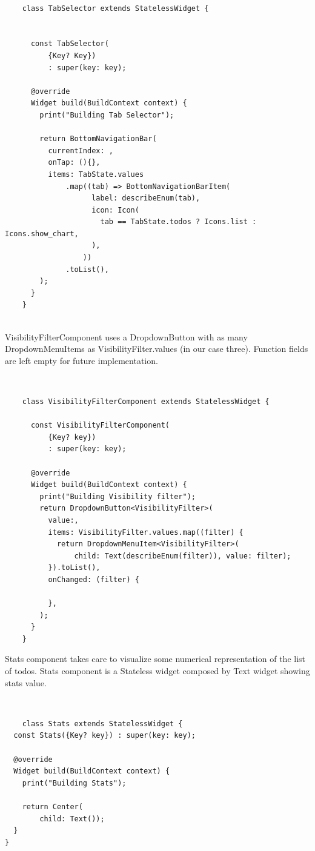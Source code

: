 	\mbox{}\\
	
	 \mbox{}
	\begin{verbatim}
	class TabSelector extends StatelessWidget {
	
	
	  const TabSelector(
	      {Key? Key})
	      : super(key: key);
	
	  @override
	  Widget build(BuildContext context) {
	    print("Building Tab Selector");
	
	    return BottomNavigationBar(
	      currentIndex: ,
	      onTap: (){},
	      items: TabState.values
	          .map((tab) => BottomNavigationBarItem(
	                label: describeEnum(tab),
	                icon: Icon(
	                  tab == TabState.todos ? Icons.list : Icons.show_chart,
	                ),
	              ))
	          .toList(),
	    );
	  }
	}
	
	\end{verbatim}
	
	\mbox{}
	
	VisibilityFilterComponent uses a DropdownButton with as many DropdownMenuItems as VisibilityFilter.values (in our case three). Function fields are left empty for future implementation.
	
	\mbox{}\\
	
	 \mbox{}
	\begin{verbatim}
	class VisibilityFilterComponent extends StatelessWidget {
	
	  const VisibilityFilterComponent(
	      {Key? key})
	      : super(key: key);
	
	  @override
	  Widget build(BuildContext context) {
	    print("Building Visibility filter");
	    return DropdownButton<VisibilityFilter>(
	      value:,
	      items: VisibilityFilter.values.map((filter) {
	        return DropdownMenuItem<VisibilityFilter>(
	            child: Text(describeEnum(filter)), value: filter);
	      }).toList(),
	      onChanged: (filter) {
	       
	      },
	    );
	  }
	}
	\end{verbatim}
	
	\mbox{}
	
	Stats component takes care to visualize some numerical representation of the list of todos. Stats component is a Stateless widget composed by Text widget showing stats value.
	
	\mbox{}\\
	
	 \mbox{}
	\begin{verbatim}
	class Stats extends StatelessWidget {
  const Stats({Key? key}) : super(key: key);

  @override
  Widget build(BuildContext context) {
    print("Building Stats");

    return Center(
        child: Text());
  }
}
	\end{verbatim}
	
	\mbox{}
	
	
